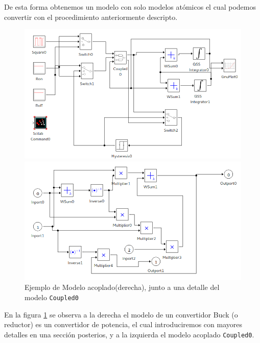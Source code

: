         De esta forma obtenemos un modelo con solo modelos atómicos el cual podemos convertir con el procedimiento anteriormente descripto.

\begin{figure}[H]
        \begin{minipage}{0.5\textwidth}
        \includegraphics[width=\linewidth]{buck_disk}
        \end{minipage}
        \begin{minipage}{0.5\textwidth}
        \includegraphics[width=\linewidth]{buck_disk_coupled0}
        \end{minipage}
 \label{fig:coupledsample}
 \caption{Ejemplo de Modelo acoplado(derecha), junto a una detalle del modelo \texttt{Coupled0}}
\end{figure}

        En la figura \ref{fig:coupledsample}  se observa a la derecha el modelo de un convertidor Buck (o reductor) es un convertidor de potencia, 
        el cual introduciremos con mayores detalles en una sección posterios, y a la izquierda el modelo acoplado \texttt{Coupled0}.

